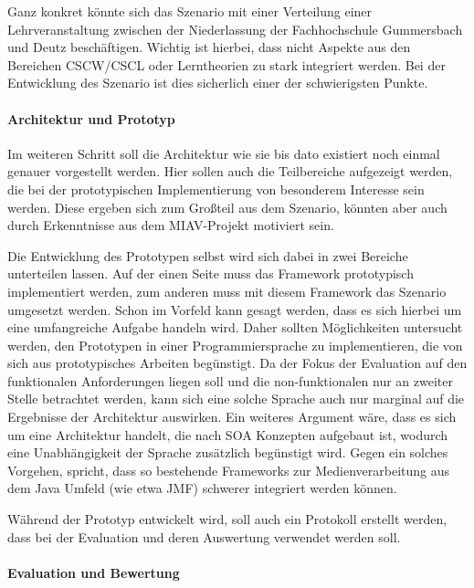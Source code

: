 \documentclass[12pt,headsepline,a4paper,bibtotoc,liststotoc,DIV12,BCOR12mm]{scrartcl}
\begin{document}
  Ganz konkret könnte sich das Szenario mit einer Verteilung einer Lehrveranstaltung zwischen der Niederlassung der Fachhochschule Gummersbach und Deutz beschäftigen. Wichtig ist hierbei, dass nicht Aspekte aus den Bereichen CSCW/CSCL oder Lerntheorien zu stark integriert werden. Bei der Entwicklung des Szenario ist dies sicherlich einer der schwierigsten Punkte.


\paragraph{Architektur und Prototyp} %
\label{par:architektur_und_prototyp}

  Im weiteren Schritt soll die Architektur wie sie bis dato existiert noch einmal genauer vorgestellt werden. Hier sollen auch die Teilbereiche aufgezeigt werden, die bei der prototypischen Implementierung von besonderem Interesse sein werden. Diese ergeben sich zum Großteil aus dem Szenario, könnten aber auch durch Erkenntnisse aus dem MIAV-Projekt motiviert sein.
  
  Die Entwicklung des Prototypen selbst wird sich dabei in zwei Bereiche unterteilen lassen. Auf der einen Seite muss das Framework prototypisch implementiert werden, zum anderen muss mit diesem Framework das Szenario umgesetzt werden. Schon im Vorfeld kann gesagt werden, dass es sich hierbei um eine umfangreiche Aufgabe handeln wird. Daher sollten Möglichkeiten untersucht werden, den Prototypen in einer Programmiersprache zu implementieren, die von sich aus prototypisches Arbeiten begünstigt. Da der Fokus der Evaluation auf den funktionalen Anforderungen liegen soll und die non-funktionalen nur an zweiter Stelle betrachtet werden, kann sich eine solche Sprache auch nur marginal auf die Ergebnisse der Architektur auswirken. Ein weiteres Argument wäre, dass es sich um eine Architektur handelt, die nach SOA Konzepten aufgebaut ist, wodurch eine Unabhängigkeit der Sprache zusätzlich begünstigt wird. Gegen ein solches Vorgehen, spricht, dass so bestehende Frameworks zur Medienverarbeitung aus dem Java Umfeld (wie etwa JMF) schwerer integriert werden können.
  
  Während der Prototyp entwickelt wird, soll auch ein Protokoll erstellt werden, dass bei der Evaluation und deren Auswertung verwendet werden soll.
  

\paragraph{Evaluation und Bewertung} %
\label{par:evaluation_und_bewertung}
\end{document}
